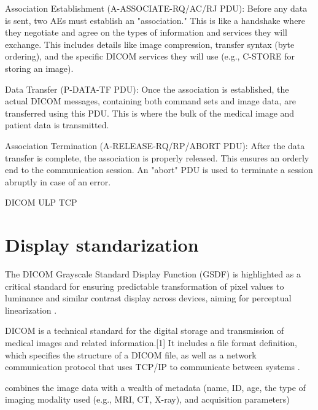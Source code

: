     Association Establishment (A-ASSOCIATE-RQ/AC/RJ PDU): Before any data is sent, two AEs must establish an "association." This is like a handshake where they negotiate and agree on the types of information and services they will exchange. This includes details like image compression, transfer syntax (byte ordering), and the specific DICOM services they will use (e.g., C-STORE for storing an image).

Data Transfer (P-DATA-TF PDU): Once the association is established, the actual DICOM messages, containing both command sets and image data, are transferred using this PDU. This is where the bulk of the medical image and patient data is transmitted.

Association Termination (A-RELEASE-RQ/RP/ABORT PDU): After the data transfer is complete, the association is properly released. This ensures an orderly end to the communication session. An "abort" PDU is used to terminate a session abruptly in case of an error.

DICOM ULP
TCP

\section{Display standarization}
The DICOM Grayscale Standard Display Function (GSDF) is highlighted as a critical standard for ensuring predictable transformation of pixel values to luminance and similar contrast display across devices, aiming for perceptual linearization \cite{bushberg2011essential}.

DICOM is a technical standard for the digital storage and transmission
of medical images and related information.[1] It includes a file
format definition, which specifies the structure of a DICOM file, as
well as a network communication protocol that uses TCP/IP to
communicate between systems \cite{wikipedia2025DICOM}.

combines the image data with a wealth of metadata (name, ID, age, the type of imaging modality used (e.g., MRI, CT, X-ray), and acquisition parameters)




